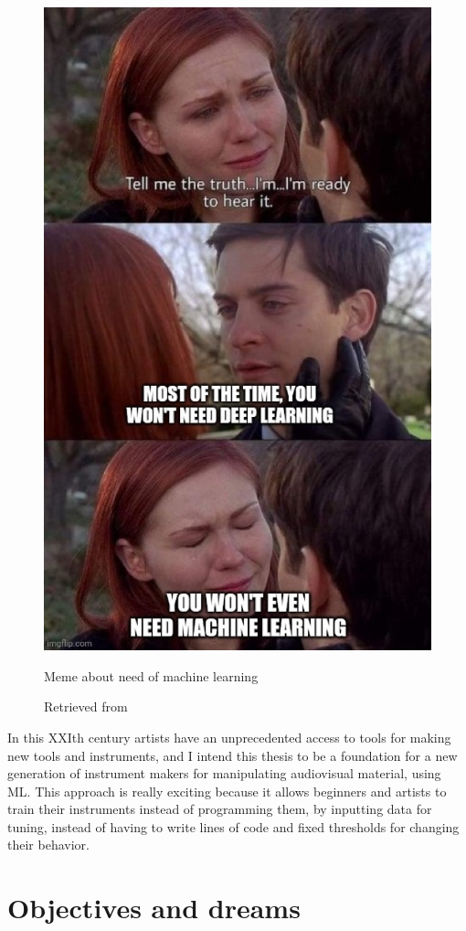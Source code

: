 \begin{figure}[ht]
  \centering
  \includegraphics[width=0.75\linewidth,height=0.40\textheight,keepaspectratio]{images/meme-spider-man.jpg}
  \caption{Meme about need of machine learning}
  \caption*{Retrieved from \cite{website-twitter-dynamicwebpaige-meme}}
  \label{fig:meme-spider-man}
\end{figure}

In this XXIth century artists have an unprecedented access to tools for making new tools and instruments, and I intend this thesis to be a foundation for a new generation of instrument makers for manipulating audiovisual material, using \acrshort{ML}. This approach is really exciting because it allows beginners and artists to train their instruments instead of programming them, by inputting data for tuning, instead of having to write lines of code and fixed thresholds for changing their behavior.

\section{Objectives and dreams}


